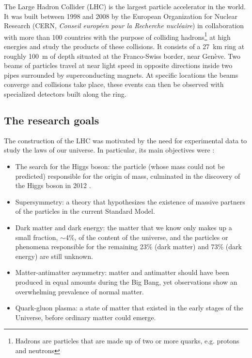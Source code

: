 The Large Hadron Collider (LHC) is the largest particle accelerator in the world. It was built between 1998 and 2008 by the European Organization for Nuclear Research (CERN, \textit{Conseil européen pour la Recherche nucléaire}) in collaboration with more than 100 countries with the purpose of colliding hadrons\footnote{\label{footnote:hadrons}Hadrons are particles that are made up of two or more quarks, e.g. protons and neutrons} at high energies and study the products of these collisions. It consists of a \qty{27}{\kilo\meter} ring at roughly \qty{100}{\meter} of depth situated at the Franco-Swiss border, near Genève. Two beams of particles travel at near light speed in opposite directions inside two pipes surrounded by superconducting magnets. At specific locations the beams converge and collisions take place, these events can then be observed with specialized detectors built along the ring.


\subsection{The research goals}%

The construction of the LHC was motivated by the need for experimental data to study the laws of our universe. In particular, its main objectives were \cite{homeFactsFigures}:
\begin{itemize}
    \item The search for the Higgs boson: the particle (whose mass could not be predicted) responsible for the origin of mass, culminated in the discovery of the Higgs boson in 2012 \cite{ATLAS:2012yve}. 
    \item Supersymmetry: a theory that hypothesizes the existence of massive partners of the particles in the current Standard Model.
    \item Dark matter and dark energy: the matter that we know only makes up a small fraction, $\sim$4\%, of the content of the universe, and the particles or phenomena responsible for the remaining 23\% (dark matter) and 73\% (dark energy) are still unknown.
    \item Matter-antimatter asymmetry: matter and antimatter should have been produced in equal amounts during the Big Bang, yet observations show an overwhelming prevalence of normal matter.
    \item Quark-gluon plasma: a state of matter that existed in the early stages of the Universe, before ordinary matter could emerge.
\end{itemize}

